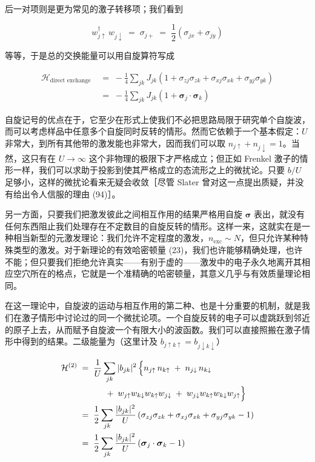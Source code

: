 后一对项则是更为常见的激子转移项；我们看到

\begin{equation*}
w^{\dagger}_{j\uparrow}\, w_{j\downarrow} \;=\; \sigma_{j+} \;=\; \frac{1}{2}\left(\sigma_{jx} + \sigma_{jy}\right)
\end{equation*}

等等，于是总的交换能量可以用自旋算符写成

\begin{align*}
\mathcal{H}_{\text{direct exchange}} \;&=\; -\frac{1}{4} \sum_{jk} J_{jk}\left(1 + \sigma_{zj}\sigma_{zk} + \sigma_{xj}\sigma_{xk} + \sigma_{yj}\sigma_{yk}\right) \\
&=\; -\frac{1}{4} \sum_{jk} J_{jk}\left(1 + \boldsymbol{\sigma}_{j}\cdot\boldsymbol{\sigma}_{k}\right) \tag{23}
\end{align*}

自旋记号的优点在于，它至少在形式上使我们不必把思路局限于研究单个自旋波，而可以考虑样品中任意多个自旋同时反转的情形。然而它依赖于一个基本假定：$U$ 非常大，到所有其他带的激发能也非常大，因而我们可以取 $n_{j\uparrow} + n_{j\downarrow} = 1$。当然，这只有在 $U\to\infty$ 这个非物理的极限下才严格成立；但正如 Frenkel 激子的情形一样，我们可以求助于投影到使其严格成立的态流形之上的微扰论。只要 $b/U$ 足够小，这样的微扰论看来无疑会收敛［尽管 Slater 曾对这一点提出质疑，并没有给出令人信服的理由 (94)］。

另一方面，只要我们把激发彼此之间相互作用的结果严格用自旋 $\boldsymbol{\sigma}$ 表出，就没有任何东西阻止我们处理存在不定数目的自旋反转的情形。这样一来，这就实在是一种相当新型的元激发理论：我们允许不定程度的激发，$n_{\text{exc}}\sim N$，但只允许某种特殊类型的激发。对于新理论的有效哈密顿量 (23)，我们也许能够精确处理，也许不能；但只要我们拒绝允许真实——有别于虚的——激发中的电子永久地离开其相应空穴所在的格点，它就是一个准精确的哈密顿量，其意义几乎与有效质量理论相同。

在这一理论中，自旋波的运动与相互作用的第二种、也是十分重要的机制，就是我们在激子情形中讨论过的同一个微扰论项。一个自旋反转的电子可以虚跳跃到邻近的原子上去，从而赋予自旋波一个有限大小的波函数。我们可以直接照搬在激子情形中得到的结果。二级能量为（这里计及 $b_{j\uparrow k\uparrow} = b_{j\downarrow k\downarrow}$）

\begin{align*}
\mathcal{H}^{(2)} \;&=\; \frac{1}{U} \sum_{jk} |b_{jk}|^{2}\, \Bigl\{ n_{j\uparrow}\, n_{k\uparrow} \;+\; n_{j\downarrow}\, n_{k\downarrow} \\
&\qquad\quad +\; w_{j\uparrow} w_{k\downarrow} w_{k\uparrow} w_{j\downarrow} \;+\; w_{j\downarrow} w_{k\uparrow} w_{k\downarrow} w_{j\uparrow} \Bigr\} \\
&=\; \frac{1}{2} \sum_{jk} \frac{|b_{jk}|^{2}}{U}\left(\sigma_{zj}\sigma_{zk} + \sigma_{xj}\sigma_{xk} + \sigma_{yj}\sigma_{yk} - 1\right) \\
&=\; \frac{1}{2} \sum_{jk} \frac{|b_{jk}|^{2}}{U}\left(\boldsymbol{\sigma}_{j}\cdot\boldsymbol{\sigma}_{k} - 1\right)
\end{align*}

